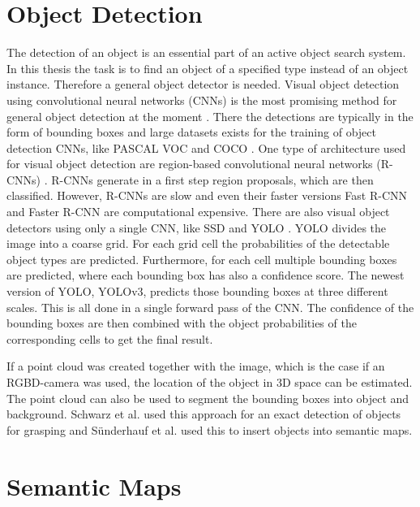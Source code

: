 \section{Object Detection}

The detection of an object is an essential part of an active object search system. In this thesis the task is to find an object of a specified type instead of an object instance. Therefore a general object detector is needed. Visual object detection using convolutional neural networks (CNNs) \cite{CNN} is the most promising method for general object detection at the moment \cite{rcnn}. There the detections are typically in the form of bounding boxes and large datasets exists for the training of object detection CNNs, like PASCAL VOC \cite{voc} and COCO \cite{coco}. One type of architecture used for visual object detection are region-based convolutional neural networks (R-CNNs) \cite{rcnn}. R-CNNs generate in a first step region proposals, which are then classified. However, R-CNNs are slow and even their faster versions Fast R-CNN \cite{fast_rcnn} and Faster R-CNN \cite{faster_rcnn} are computational expensive. There are also visual object detectors using only a single CNN, like SSD \cite{ssd} and YOLO \cite{yolo}\cite{yolo2}\cite{yolo3}. YOLO divides the image into a coarse grid. For each grid cell the probabilities of the detectable object types are predicted. Furthermore, for each cell multiple bounding boxes are predicted, where each bounding box has also a confidence score. The newest version of YOLO, YOLOv3, predicts those bounding boxes at three different scales. This is all done in a single forward pass of the CNN. The confidence of the bounding boxes are then combined with the object probabilities of the corresponding cells to get the final result.

If a point cloud was created together with the image, which is the case if an RGBD-camera was used, the location of the object in 3D space can be estimated. The point cloud can also be used to segment the bounding boxes into object and background. Schwarz et al. \cite{TitanX} used this approach for an exact detection of objects for grasping and S{\"{u}}nderhauf et al. \cite{CNN_SLAM} used this to insert objects into semantic maps.

\section{Semantic Maps}

